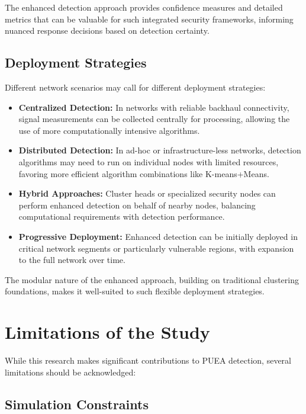 The enhanced detection approach provides confidence measures and detailed metrics that can be valuable for such integrated security frameworks, informing nuanced response decisions based on detection certainty.

\subsection{Deployment Strategies}

Different network scenarios may call for different deployment strategies:

\begin{itemize}
    \item \textbf{Centralized Detection:} In networks with reliable backhaul connectivity, signal measurements can be collected centrally for processing, allowing the use of more computationally intensive algorithms.
    
    \item \textbf{Distributed Detection:} In ad-hoc or infrastructure-less networks, detection algorithms may need to run on individual nodes with limited resources, favoring more efficient algorithm combinations like K-means+Means.
    
    \item \textbf{Hybrid Approaches:} Cluster heads or specialized security nodes can perform enhanced detection on behalf of nearby nodes, balancing computational requirements with detection performance.
    
    \item \textbf{Progressive Deployment:} Enhanced detection can be initially deployed in critical network segments or particularly vulnerable regions, with expansion to the full network over time.
\end{itemize}

The modular nature of the enhanced approach, building on traditional clustering foundations, makes it well-suited to such flexible deployment strategies.

\section{Limitations of the Study}

While this research makes significant contributions to PUEA detection, several limitations should be acknowledged:

\subsection{Simulation Constraints}

